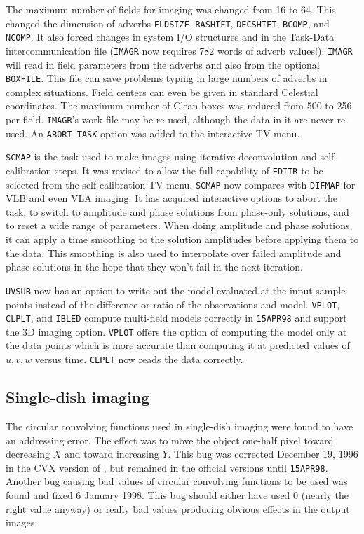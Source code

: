 The maximum number of fields for imaging was changed from 16 to 64.
This changed the dimension of adverbs {\tt FLDSIZE}, {\tt RASHIFT},
{\tt DECSHIFT}, {\tt BCOMP}, and \hbox{{\tt NCOMP}}.  It also forced
changes in system I/O structures and in the Task-Data
intercommunication file ({\tt IMAGR} now requires 782 words of adverb
values!).  {\tt IMAGR} will read in field parameters from the adverbs
and also from the optional \hbox{{\tt BOXFILE}}.  This file can save
problems typing in large numbers of adverbs in complex situations.
Field centers can even be given in standard Celestial coordinates.
The maximum number of Clean boxes was reduced from 500 to 256 per
field.  {\tt IMAGR}'s work file may be re-used, although the data in
it are never re-used.  An {\tt ABORT-TASK} option was added to the
interactive TV menu.

{\tt SCMAP} is the task used to make images using iterative
deconvolution and self-calibration steps. It was revised to allow the
full capability of {\tt EDITR} to be selected from the
self-calibration TV menu.  {\tt SCMAP} now compares with {\tt DIFMAP}
for VLB and even VLA imaging.  It has acquired interactive options to
abort the task, to switch to amplitude and phase solutions from
phase-only solutions, and to reset a wide range of parameters.  When
doing amplitude and phase solutions, it can apply a time smoothing to
the solution amplitudes before applying them to the data.  This
smoothing is also used to interpolate over failed amplitude and phase
solutions in the hope that they won't fail in the next iteration.

{\tt UVSUB} now has an option to write out the model evaluated at the
input sample points instead of the difference or ratio of the
observations and model.   {\tt VPLOT}, {\tt CLPLT}, and {\tt IBLED}
compute multi-field models correctly in {\tt 15APR98} and support the
3D imaging option.  {\tt VPLOT} offers the option of computing the
model only at the data points which is more accurate than computing it
at predicted values of $u,v,w$ versus time.  {\tt CLPLT} now reads the
data correctly.

\subsection{Single-dish imaging}

     The circular convolving functions used in single-dish imaging
were found to have an addressing error.  The effect was to move the
object one-half pixel toward decreasing $X$ and toward increasing
\hbox{$Y$}.  This bug was corrected December 19, 1996 in the CVX
version of \AIPS, but remained in the official versions until
\hbox{{\tt 15APR98}}.  Another bug causing bad values of circular
convolving functions to be used was found and fixed 6 January 1998.
This bug should either have used 0 (nearly the right value anyway) or
really bad values producing obvious effects in the output images.

